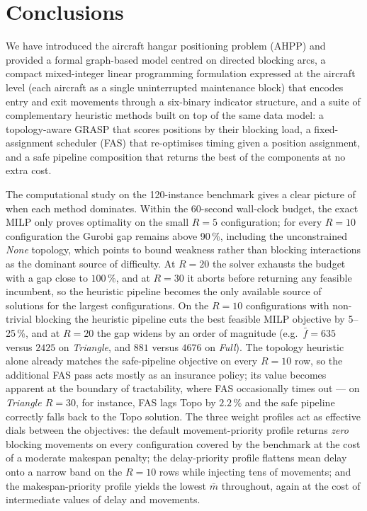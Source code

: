 \section{Conclusions}
\label{sec:conclusions}

We have introduced the aircraft hangar positioning problem (AHPP) and
provided a formal graph-based model centred on directed blocking arcs, a
compact mixed-integer linear programming formulation expressed at the
aircraft level (each aircraft as a single uninterrupted maintenance
block) that encodes entry and exit movements through a six-binary
indicator structure, and a suite of complementary heuristic methods
built on top of the same data model: a topology-aware GRASP that scores
positions by their blocking load, a fixed-assignment scheduler (FAS)
that re-optimises timing given a position assignment, and a safe
pipeline composition that returns the best of the components at no
extra cost.

The computational study on the 120-instance benchmark gives a clear
picture of when each method dominates.  Within the 60-second wall-clock
budget, the exact MILP only proves optimality on the small $R{=}5$
configuration; for every $R{=}10$ configuration the Gurobi gap remains
above 90\,\%, including the unconstrained \emph{None} topology, which
points to bound weakness rather than blocking interactions as the
dominant source of difficulty.  At $R{=}20$ the solver exhausts the
budget with a gap close to $100\,\%$, and at $R{=}30$ it aborts before
returning any feasible incumbent, so the heuristic pipeline becomes the
only available source of solutions for the largest configurations.  On
the $R{=}10$ configurations with non-trivial blocking the heuristic
pipeline cuts the best feasible MILP objective by 5--25\,\%, and at
$R{=}20$ the gap widens by an order of magnitude (e.g.\ $\bar f = 635$
versus $2425$ on \emph{Triangle}, and $881$ versus $4676$ on
\emph{Full}).  The topology heuristic alone already matches the
safe-pipeline objective on every $R{=}10$ row, so the additional FAS
pass acts mostly as an insurance policy; its value becomes apparent at
the boundary of tractability, where FAS occasionally times out --- on
\emph{Triangle $R{=}30$}, for instance, FAS lags Topo by $2.2\,\%$ and
the safe pipeline correctly falls back to the Topo solution.  The three
weight profiles act as effective dials between the objectives: the
default movement-priority profile returns \emph{zero} blocking
movements on every configuration covered by the benchmark at the cost
of a moderate makespan penalty; the delay-priority profile flattens
mean delay onto a narrow band on the $R{=}10$ rows while injecting tens
of movements; and the makespan-priority profile yields the lowest
$\bar m$ throughout, again at the cost of intermediate values of delay
and movements.

